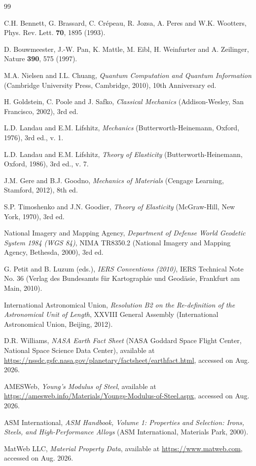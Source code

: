 \documentclass[11pt]{article}
\begin{document}
	\begin{thebibliography}{99}
		
		C.H. Bennett, G. Brassard, C. Crépeau, R. Jozsa, A. Peres and
		W.K. Wootters, Phys. Rev. Lett. \textbf{70}, 1895 (1993).
		
		D. Bouwmeester, J.-W. Pan, K. Mattle, M. Eibl, H. Weinfurter and
		A. Zeilinger, Nature \textbf{390}, 575 (1997).
		
		M.A. Nielsen and I.L. Chuang, \textit{Quantum Computation and
			Quantum Information} (Cambridge University Press, Cambridge,
		2010), 10th Anniversary ed.
		
		H. Goldstein, C. Poole and J. Safko, \textit{Classical Mechanics}
		(Addison-Wesley, San Francisco, 2002), 3rd ed.
		
		L.D. Landau and E.M. Lifshitz, \textit{Mechanics}
		(Butterworth-Heinemann, Oxford, 1976), 3rd ed., v. 1.
		
		L.D. Landau and E.M. Lifshitz, \textit{Theory of Elasticity}
		(Butterworth-Heinemann, Oxford, 1986), 3rd ed., v. 7.
		
		J.M. Gere and B.J. Goodno, \textit{Mechanics of Materials}
		(Cengage Learning, Stamford, 2012), 8th ed.
		
		S.P. Timoshenko and J.N. Goodier, \textit{Theory of Elasticity}
		(McGraw-Hill, New York, 1970), 3rd ed.
		
		National Imagery and Mapping Agency, \textit{Department of Defense
			World Geodetic System 1984 (WGS 84)}, NIMA TR8350.2 (National
		Imagery and Mapping Agency, Bethesda, 2000), 3rd ed.
		
		G. Petit and B. Luzum (eds.), \textit{IERS Conventions (2010)},
		IERS Technical Note No. 36 (Verlag des Bundesamts für
		Kartographie und Geodäsie, Frankfurt am Main, 2010).
		
		International Astronomical Union, \textit{Resolution B2 on the
			Re-definition of the Astronomical Unit of Length}, XXVIII General
		Assembly (International Astronomical Union, Beijing, 2012).
		
		D.R. Williams, \textit{NASA Earth Fact Sheet} (NASA Goddard Space
		Flight Center, National Space Science Data Center), available at
		\url{https://nssdc.gsfc.nasa.gov/planetary/factsheet/earthfact.html},
		accessed on Aug. 2026.
		
		AMESWeb, \textit{Young's Modulus of Steel}, available at
		\url{https://amesweb.info/Materials/Youngs-Modulus-of-Steel.aspx},
		accessed on Aug. 2026.
		
		ASM International, \textit{ASM Handbook, Volume 1: Properties and
			Selection: Irons, Steels, and High-Performance Alloys} (ASM
		International, Materials Park, 2000).
		
		MatWeb LLC, \textit{Material Property Data}, available at
		\url{https://www.matweb.com}, accessed on Aug. 2026.
		
	\end{thebibliography}
	
\end{document}
